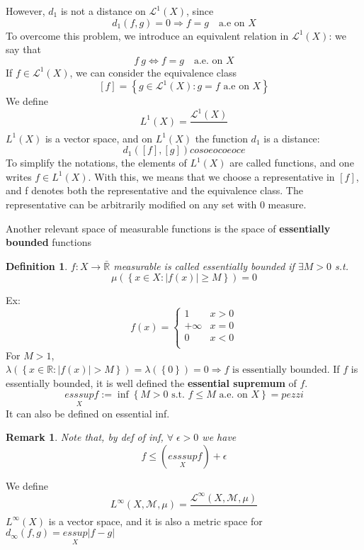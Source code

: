 \documentclass[a4paper,12pt]{article}
\theoremstyle{break}
\newtheorem{remark}[section]{Remark}
\newtheorem{definition}{Definition}[section]
\numberwithin{equation}{section}
\begin{document}
However, \(d_1\) is not a distance on \(\mathcal{L}^1(X)\), since 
\[
    d_1(f,g) = 0 \Longrightarrow f=g \quad \mbox{a.e on }X
\tag*{(Pseudo-distance)}\]
To overcome this problem, we introduce an equivalent relation in \(\mathcal{L}^1(X)\): we say that 
\[
    f ~ g \Longleftrightarrow f = g \quad \mbox{a.e. on }X
\]
If \(f \in \mathcal{L}^1(X)\), we can consider the equivalence class
\[
    [f] = \left\lbrace g \in \mathcal{L}^1(X) : g = f \mbox{ a.e on }X \right\rbrace
\]
We define
\[
    L^1(X) = \frac{\mathcal{L}^1(X)}{~}
\]
\(L^1(X)\) is a vector space, and on \(L^1(X)\) the function \(d_1\) is a distance: 
\[
    d_1([f], [g]) cosoeocoeoce
\]
To simplify the notations, the elements of \(L^1(X)\) are called functions, and one writes \(f \in L^1(X)\). With this, we means that we choose a representative in \([f]\), and f denotes both the representative and the equivalence class. The representative can be arbitrarily modified on any set with \(0\) measure.

Another relevant space of measurable functions is the space of \textbf{essentially bounded} functions
\begin{definition}
    \(f : X \to \bar{\mathbb{R}}\) measurable is called essentially bounded if \(\exists M > 0\) s.t.
    \[
        \mu(\left\lbrace x \in X : \vert f(x) \vert \geq M \right\rbrace) = 0
    \]
\end{definition}
Ex: 
\[f(x) = \begin{cases}
    1 & x > 0 \\
+\infty & x = 0 \\
0 & x < 0 \\
\end{cases}
\] 
For \(M > 1\), \(\lambda(\left\lbrace x \in \mathbb{R} : \vert f(x) \vert > M\right\rbrace) = \lambda(\left\lbrace 0 \right\rbrace) = 0 \Longrightarrow f\mbox{ is essentially bounded}\).
If \(f\) is essentially bounded, it is well defined the \textbf{essential supremum} of \(f\).
\[
    \underset{X}{esssup} f := \inf \left\lbrace M > 0 \mbox{ s.t. } f \leq M \mbox{ a.e. on }X\right\rbrace = pezzi
\]
It can also be defined on essential inf.
\begin{remark}
    Note that, by def of inf, \(\forall \; \epsilon > 0\) we have 
    \[
        f \leq (\underset{X}{esssup} f) + \epsilon
    \]
\end{remark}
We define 
\[
    L^{\infty} (X, \mathcal{M}, \mu) = \frac{\mathcal{L}^{\infty}(X, \mathcal{M}, \mu)}{~}
\]
\(L^{\infty}(X)\) is a vector space, and it is also a metric space for \(d_{\infty}(f,g) = \underset{X}{essup} \vert f-g \vert\)
\end{document}
